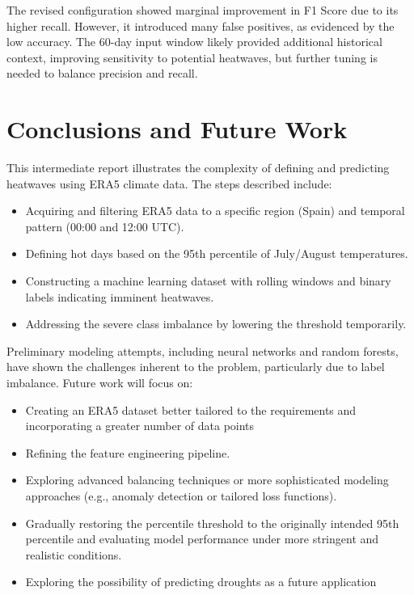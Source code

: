 \documentclass[8pt,a4paper]{article}
\begin{document}
The revised configuration showed marginal improvement in F1 Score due to its higher recall. However, it introduced many false positives, as evidenced by the low accuracy. The 60-day input window likely provided additional historical context, improving sensitivity to potential heatwaves, but further tuning is needed to balance precision and recall.



\section{Conclusions and Future Work}
This intermediate report illustrates the complexity of defining and predicting heatwaves using ERA5 climate data. The steps described include:
\begin{itemize}
    \item Acquiring and filtering ERA5 data to a specific region (Spain) and temporal pattern (00:00 and 12:00 UTC).
    \item Defining hot days based on the 95th percentile of July/August temperatures.
    \item Constructing a machine learning dataset with rolling windows and binary labels indicating imminent heatwaves.
    \item Addressing the severe class imbalance by lowering the threshold temporarily.
\end{itemize}

Preliminary modeling attempts, including neural networks and random forests, have shown the challenges inherent to the problem, particularly due to label imbalance. Future work will focus on:
\begin{itemize}
	\item Creating an ERA5 dataset better tailored to the requirements and incorporating a greater number of data points
    \item Refining the feature engineering pipeline.
    \item Exploring advanced balancing techniques or more sophisticated modeling approaches (e.g., anomaly detection or tailored loss functions).
    \item Gradually restoring the percentile threshold to the originally intended 95th percentile and evaluating model performance under more stringent and realistic conditions.
    \item Exploring the possibility of predicting droughts as a future application
\end{itemize}
\end{document}
